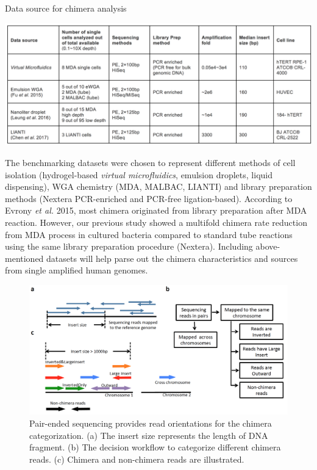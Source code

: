 \begin{table}
\caption{Data source for chimera analysis}
\label{tab:chimeraDataSource}
\includegraphics[width=\linewidth]{./figures/Chimera_DataTable}
\end{table}

The benchmarking datasets were chosen to represent different methods of cell isolation (hydrogel-based \textit{virtual microfluidics}, emulsion droplets, liquid dispensing), WGA chemistry (MDA, MALBAC, LIANTI) and library preparation methods (Nextera PCR-enriched and PCR-free ligation-based). According to Evrony \textit{et al.} 2015, most chimera originated from library preparation after MDA reaction. However, our previous study showed a multifold chimera rate reduction from MDA process in cultured bacteria compared to standard tube reactions using the same library preparation procedure (Nextera). Including above-mentioned datasets will help parse out the chimera characteristics and sources from single amplified human genomes. 

\begin{figure}
\centering
\includegraphics[keepaspectratio,width=1\textwidth]{./figures/ChimeraCategories_cropped}
\caption[Pair-ended sequencing for the chimera categorization.]{Pair-ended sequencing provides read orientations for the chimera categorization. (a) The insert size represents the length of DNA fragment. (b) The decision workflow to categorize different chimera reads. (c) Chimera and non-chimera reads are illustrated.}
\label{fig:chimeraWorkflow}
\end{figure}

